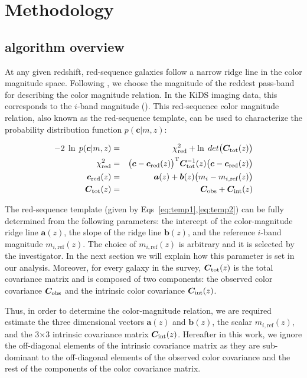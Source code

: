 \documentclass[fleqn,usenatbib]{mnras}
\newcommand{\vc}{\bm{c}}
\newcommand{\va}{\bm{a}(z)}
\newcommand{\vb}{\bm{b}(z)}
\newcommand{\vCo}{\bm{C}_{\rm obs}}
\newcommand{\vCi}{\bm{C}_{\rm int}(z)}
\newcommand{\vCt}{\bm{C}_{\rm tot}(z)}
\newcommand{\vCti}{\bm{C}_{\rm tot}^{-1}(z)}
\newcommand{\mrefz}{m_{i, \mathrm{ref}}}
\newcommand{\mi}{m_{i}}
\begin{document}
\section{Methodology}\label{sec:methodology}

\subsection{algorithm overview}

At any given redshift, red-sequence galaxies follow a narrow ridge line in the color magnitude space. Following \citealt{rozo2016}, we choose the magnitude of the reddest pass-band for describing the color magnitude relation. In the KiDS imaging data, this corresponds to the $i$-band magnitude (\citealt{kids_dr3}). This red-sequence color magnitude relation, also known as the red-sequence template, can be used to characterize the probability distribution function 
$p(\vc|m,z)$:

\begin{eqnarray}
-2 \; \ln \; p(\vc|m,z) &=& \chi^{2}_{\rm red} + \ln \; det\big(\vCt\big) \label{eq:temp}\\ 
\chi^{2}_{\rm red} &=& \big(\vc  - \vc_{\rm red}(z)\big)^{\rm T} \vCti \big(\vc  - \vc_{\rm red}(z)\big)  \\
\vc_{\rm red}(z) &=& \va + \vb \big(\mi - \mrefz(z)\big) \label{eq:temp1}\\
\vCt &=& \vCo +\vCi \label{eq:temp2}
\end{eqnarray}

The red-sequence template (given by Eqs~\ref{eq:temp1},\ref{eq:temp2}) can be fully determined from the following parameters: the intercept of the color-magnitude ridge line $\va$, the slope of the ridge line $\vb$, and the reference $i$-band magnitude $\mrefz(z)$. The choice of $\mrefz(z)$ is arbitrary and it is selected by the investigator. In the next section we will explain how this parameter is set in our analysis. Moreover, for every galaxy in the survey, $\vCt$ is the total covariance matrix and is composed of two components: the observed color covariance $\vCo$ and the intrinsic color covariance $\vCi$. 

Thus, in order to determine the color-magnitude relation, we are required estimate the three dimensional vectors $\va$ and $\vb$, the scalar $\mrefz(z)$, and the 3$\times$3 intrinsic covariance matrix $\vCi$. Hereafter in this work, we ignore the off-diagonal elements of the intrinsic covariance matrix as they are sub-dominant to the off-diagonal elements of the observed color covariance and the rest of the components of the color covariance matrix.   
\end{document}

